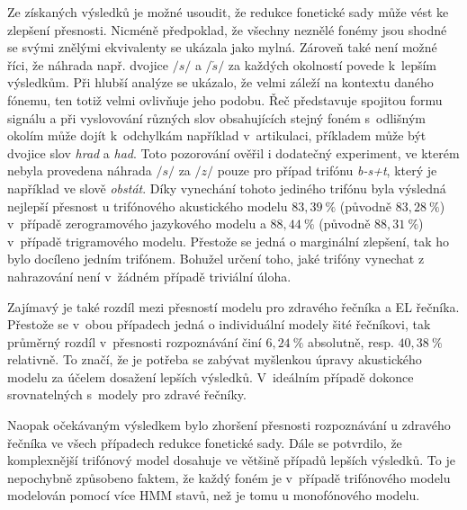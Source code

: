 Ze získaných výsledků je možné usoudit, že redukce fonetické sady může vést ke zlepšení přesnosti.
Nicméně předpoklad, že všechny neznělé fonémy jsou shodné se svými znělými ekvivalenty se ukázala jako mylná.
Zároveň také není možné říci, že náhrada např. dvojice $/s/$ a $/\check{s}/$  za každých okolností povede  k~lepším výsledkům.
Při hlubší analýze se ukázalo, že velmi záleží na kontextu daného fónemu, ten totiž velmi ovlivňuje jeho podobu.
Řeč představuje spojitou formu signálu a při vyslovování různých slov obsahujících stejný foném s~odlišným okolím  může dojít  k~odchylkám například v~artikulaci, příkladem může být dvojice slov \textit{hrad} a \textit{had}.
Toto pozorování ověřil i dodatečný experiment, ve kterém nebyla provedena náhrada $/s/$ za $/z/$ pouze pro případ trifónu \textit{b-s+t}, který je například ve slově \textit{obstát}.
Díky vynechání tohoto jediného trifónu byla výsledná nejlepší přesnost u trifónového akustického modelu $83,39~\%$ (původně $83,28~\%$) v~případě zerogramového jazykového modelu a $88,44~\%$ (původně $88,31~\%$) v~případě trigramového modelu.
Přestože se jedná o marginální zlepšení, tak ho bylo docíleno jedním trifónem.
Bohužel určení toho, jaké trifóny vynechat z nahrazování není v~žádném případě triviální úloha.

Zajímavý je také rozdíl mezi přesností modelu pro zdravého řečníka a EL řečníka.
Přestože se v~obou případech jedná o individuální modely šité  řečníkovi, tak průměrný rozdíl v~přesnosti rozpoznávání činí $6,24~\%$ absolutně, resp. $40,38~\%$ relativně.
To značí, že je potřeba se zabývat myšlenkou úpravy akustického modelu za účelem dosažení lepších výsledků.
V~ideálním případě dokonce srovnatelných s~modely pro zdravé řečníky.

Naopak očekávaným výsledkem bylo zhoršení přesnosti rozpoznávání u zdravého řečníka ve všech případech redukce fonetické sady.
Dále se potvrdilo, že komplexnější trifónový model dosahuje ve většině případů lepších výsledků.
To je nepochybně způsobeno faktem, že každý foném je v~případě trifónového modelu modelován pomocí více HMM stavů, než je tomu u monofónového modelu.
